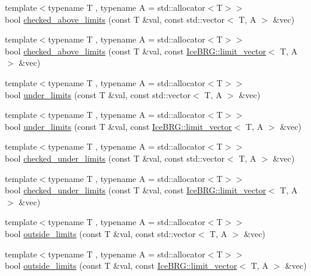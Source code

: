 \begin{DoxyCompactItemize}
\item 
{\footnotesize template$<$typename T , typename A  = std\-::allocator$<$\-T$>$$>$ }\\bool \hyperlink{namespaceIceBRG_a2389fe7efeff369cedbb856ab781c8af}{checked\-\_\-above\-\_\-limits} (const T \&val, const std\-::vector$<$ T, A $>$ \&vec)
\item 
{\footnotesize template$<$typename T , typename A  = std\-::allocator$<$\-T$>$$>$ }\\bool \hyperlink{namespaceIceBRG_a2a47e7a3d229db34ca80d8c99193f2b0}{checked\-\_\-above\-\_\-limits} (const T \&val, const \hyperlink{classIceBRG_1_1limit__vector}{Ice\-B\-R\-G\-::limit\-\_\-vector}$<$ T, A $>$ \&vec)
\item 
{\footnotesize template$<$typename T , typename A  = std\-::allocator$<$\-T$>$$>$ }\\bool \hyperlink{namespaceIceBRG_aafe25f4f0ad51f73298dd7bf319f036c}{under\-\_\-limits} (const T \&val, const std\-::vector$<$ T, A $>$ \&vec)
\item 
{\footnotesize template$<$typename T , typename A  = std\-::allocator$<$\-T$>$$>$ }\\bool \hyperlink{namespaceIceBRG_aa6300e19daf7aacf957423c46a5ef6ac}{under\-\_\-limits} (const T \&val, const \hyperlink{classIceBRG_1_1limit__vector}{Ice\-B\-R\-G\-::limit\-\_\-vector}$<$ T, A $>$ \&vec)
\item 
{\footnotesize template$<$typename T , typename A  = std\-::allocator$<$\-T$>$$>$ }\\bool \hyperlink{namespaceIceBRG_ac416bded552db2c134ff3713946f6b66}{checked\-\_\-under\-\_\-limits} (const T \&val, const std\-::vector$<$ T, A $>$ \&vec)
\item 
{\footnotesize template$<$typename T , typename A  = std\-::allocator$<$\-T$>$$>$ }\\bool \hyperlink{namespaceIceBRG_ab9f63819b1cf703cba44a420c8e462fb}{checked\-\_\-under\-\_\-limits} (const T \&val, const \hyperlink{classIceBRG_1_1limit__vector}{Ice\-B\-R\-G\-::limit\-\_\-vector}$<$ T, A $>$ \&vec)
\item 
{\footnotesize template$<$typename T , typename A  = std\-::allocator$<$\-T$>$$>$ }\\bool \hyperlink{namespaceIceBRG_a92b83173ac4b0a27eee20b87b50e388b}{outside\-\_\-limits} (const T \&val, const std\-::vector$<$ T, A $>$ \&vec)
\item 
{\footnotesize template$<$typename T , typename A  = std\-::allocator$<$\-T$>$$>$ }\\bool \hyperlink{namespaceIceBRG_a84c08c8dc501f707a52701a072ddb29f}{outside\-\_\-limits} (const T \&val, const \hyperlink{classIceBRG_1_1limit__vector}{Ice\-B\-R\-G\-::limit\-\_\-vector}$<$ T, A $>$ \&vec)

\end{DoxyCompactItemize}
